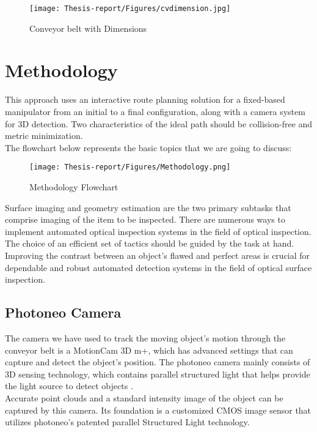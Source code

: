 \documentclass[12pt]{article}
\begin{document}
\begin{figure}[h]
    \centering
    \texttt{[image: Thesis-report/Figures/cvdimension.jpg]}
    \caption{Conveyor belt with Dimensions\cite{ref22}}
    \label{fig:cv-dimension}
\end{figure}

\section{Methodology}

This approach uses an interactive route planning solution for a fixed-based manipulator from an initial to a final configuration, along with a camera system for 3D detection.  Two characteristics of the ideal path should be collision-free and metric minimization.\\
The flowchart below represents the basic topics that we are going to discuss:
\begin{figure}[H]  %
  \centering
  \texttt{[image: Thesis-report/Figures/Methodology.png]}
  \caption{Methodology Flowchart \cite{ref18}}
  \label{fig:methodology}
\end{figure}

Surface imaging and geometry estimation are the two primary subtasks that comprise imaging of the item to be inspected. There are numerous ways to implement automated optical inspection systems in the field of optical inspection. The choice of an efficient set of tactics should be guided by the task at hand. Improving the contrast between an object's flawed and perfect areas is crucial for dependable and robust automated detection systems in the field of optical surface inspection.

\subsection{Photoneo Camera}


The camera we have used to track the moving object's motion through the conveyor belt is a 
MotionCam 3D m+, which has advanced settings that can capture and detect the object's position. The photoneo camera mainly consists of 3D sensing technology, which contains parallel structured light that helps provide the light source to detect objects \cite{ref2}.\\

Accurate point clouds and a standard intensity image of the object can be captured by this camera.  Its foundation is a customized CMOS image sensor that utilizes photoneo's patented parallel Structured Light technology\cite{ref15}.
\end{document}
